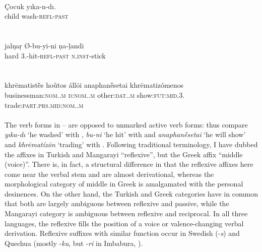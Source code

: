 \ea\label{ex:E16}
\\
\gll Çocuk  yıka-n-dı.\\
 child  wash-\textsc{refl}-\textsc{past}\\
\\
\z
\noindent \ea\label{ex:E17}
 \\
\gll jalŋa\d{r}  Ø-bu-yi-ni  \d{n}a-\d{l}andi\\
hard  3.\glsg-hit-\textsc{refl}-\textsc{past}  \textsc{n}.\textsc{inst}-stick\\
\\
\z
\noindent \ea\label{ex:E18}
\\
\gll   khr\=ematist\`{\=e}s  hoûtos áll\=oi  anaphan\'{\=e}setai  khr\=ematizómenos\\
 businessman:\textsc{nom}.\glsg.\textsc{m}  \textsc{d}:\textsc{nom}.\glsg.\textsc{m}  other:\textsc{dat}.\glsg.\textsc{m} {show:\textsc{fut}:\textsc{mid}.3.\glsg} trade:\textsc{part}.\textsc{prs}.\textsc{mid}:\textsc{nom}.\glsg.\textsc{m}\\
\\
\z
\noindent The verb forms in -- are opposed to unmarked active verb forms: thus compare \textit{yıka-dı} ‘he washed’ with , \textit{bu-ni} ‘he hit’ with  and \textit{anaphan\'{\=e}setai} ‘he will show’ and \textit{khr\=ematíz\=on} ‘trading’ with . Following traditional terminology, I have dubbed the affixes in Turkish and Mangarayi ``reflexive'', but the Greek affix ``middle (voice)''. There is, in fact, a structural difference in that the reflexive affixes here come near the verbal stem and are almost derivational, whereas the morphological category of middle in Greek is amalgamated with the personal desinences. On the other hand, the Turkish and Greek categories have in common that both are largely ambiguous between reflexive and passive, while the Mangarayi category is ambiguous between reflexive and reciprocal. In all three languages, the reflexive fills the position of a voice or valence-changing verbal derivation. Reflexive suffixes with similar function occur in Swedish (-\textit{s}) and Quechua (mostly -\textit{ku}, but -\textit{ri} in Imbabura, \citealt[90f]{Cole1982}).

